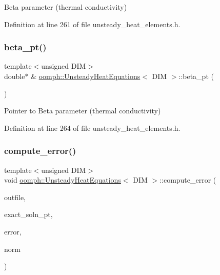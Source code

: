 Beta parameter (thermal conductivity) 



Definition at line 261 of file unsteady\+\_\+heat\+\_\+elements.\+h.

\mbox{\label{classoomph_1_1UnsteadyHeatEquations_a73b52f5aa092ab1d836843d30273d9a8}} 
\subsubsection{\texorpdfstring{beta\+\_\+pt()}{beta\_pt()}}
{\footnotesize\ttfamily template$<$unsigned D\+IM$>$ \\
double$\ast$ \& \hyperlink{classoomph_1_1UnsteadyHeatEquations}{oomph\+::\+Unsteady\+Heat\+Equations}$<$ D\+IM $>$\+::beta\+\_\+pt (\begin{DoxyParamCaption}{ }\end{DoxyParamCaption})\hspace{0.3cm}{\ttfamily [inline]}}



Pointer to Beta parameter (thermal conductivity) 



Definition at line 264 of file unsteady\+\_\+heat\+\_\+elements.\+h.

\mbox{\label{classoomph_1_1UnsteadyHeatEquations_a14e50a4b041d961cf3450788a3e231f0}} 
\subsubsection{\texorpdfstring{compute\+\_\+error()}{compute\_error()}\hspace{0.1cm}{\footnotesize\ttfamily [1/2]}}
{\footnotesize\ttfamily template$<$unsigned D\+IM$>$ \\
void \hyperlink{classoomph_1_1UnsteadyHeatEquations}{oomph\+::\+Unsteady\+Heat\+Equations}$<$ D\+IM $>$\+::compute\+\_\+error (\begin{DoxyParamCaption}\item[{std\+::ostream \&}]{outfile,  }\item[{\hyperlink{classoomph_1_1FiniteElement_a690fd33af26cc3e84f39bba6d5a85202}{Finite\+Element\+::\+Steady\+Exact\+Solution\+Fct\+Pt}}]{exact\+\_\+soln\+\_\+pt,  }\item[{double \&}]{error,  }\item[{double \&}]{norm }\end{DoxyParamCaption})\hspace{0.3cm}{\ttfamily [virtual]}}



